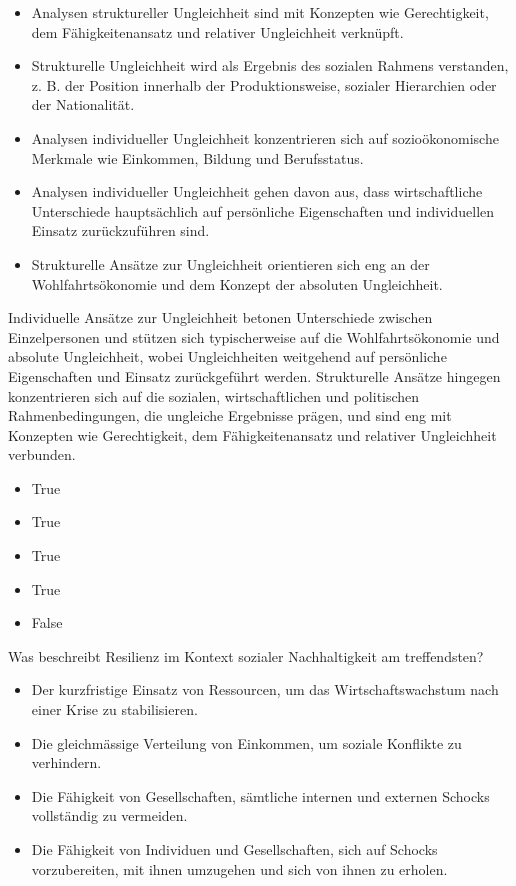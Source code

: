 \documentclass[
  nswissgerman,
  a4paper,
  openany]{book}
\providecommand{\tightlist}{%
  \setlength{\itemsep}{0pt}\setlength{\parskip}{0pt}}
\begin{document}
\begin{itemize}
\tightlist
\item[$\square$]
  Analysen struktureller Ungleichheit sind mit Konzepten wie
  Gerechtigkeit, dem Fähigkeitenansatz und relativer Ungleichheit
  verknüpft.
\item[$\square$]
  Strukturelle Ungleichheit wird als Ergebnis des sozialen Rahmens
  verstanden, z. B. der Position innerhalb der Produktionsweise,
  sozialer Hierarchien oder der Nationalität.
\item[$\square$]
  Analysen individueller Ungleichheit konzentrieren sich auf
  sozioökonomische Merkmale wie Einkommen, Bildung und Berufsstatus.
\item[$\square$]
  Analysen individueller Ungleichheit gehen davon aus, dass
  wirtschaftliche Unterschiede hauptsächlich auf persönliche
  Eigenschaften und individuellen Einsatz zurückzuführen sind.
\item[$\square$]
  Strukturelle Ansätze zur Ungleichheit orientieren sich eng an der
  Wohlfahrtsökonomie und dem Konzept der absoluten Ungleichheit.
\end{itemize}

Individuelle Ansätze zur Ungleichheit betonen Unterschiede zwischen
Einzelpersonen und stützen sich typischerweise auf die
Wohlfahrtsökonomie und absolute Ungleichheit, wobei Ungleichheiten
weitgehend auf persönliche Eigenschaften und Einsatz zurückgeführt
werden. Strukturelle Ansätze hingegen konzentrieren sich auf die
sozialen, wirtschaftlichen und politischen Rahmenbedingungen, die
ungleiche Ergebnisse prägen, und sind eng mit Konzepten wie
Gerechtigkeit, dem Fähigkeitenansatz und relativer Ungleichheit
verbunden.

\begin{itemize}
\tightlist
\item
  True
\item
  True
\item
  True
\item
  True
\item
  False
\end{itemize}

Was beschreibt Resilienz im Kontext sozialer Nachhaltigkeit am
treffendsten?

\begin{itemize}
\tightlist
\item[$\square$]
  Der kurzfristige Einsatz von Ressourcen, um das Wirtschaftswachstum
  nach einer Krise zu stabilisieren.
\item[$\square$]
  Die gleichmässige Verteilung von Einkommen, um soziale Konflikte zu
  verhindern.
\item[$\square$]
  Die Fähigkeit von Gesellschaften, sämtliche internen und externen
  Schocks vollständig zu vermeiden.
\item[$\square$]
  Die Fähigkeit von Individuen und Gesellschaften, sich auf Schocks
  vorzubereiten, mit ihnen umzugehen und sich von ihnen zu erholen.
\end{itemize}
\end{document}
